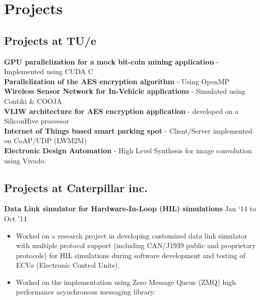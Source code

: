 \documentclass[a4paper,10pt]{article} %
\begin{document}

\section{Projects}
\subsection{Projects at TU/e}
\textbf{GPU parallelization for a mock bit-coin mining application} - Implemented using CUDA C\\
\textbf{Parallelization of the AES encryption algorithm} - Using OpenMP\\
\textbf{Wireless Sensor Network for In-Vehicle applications} - Simulated using Contiki \& COOJA\\
\textbf{VLIW architecture for AES encryption application} - developed on a SiliconHive processor\\
\textbf{Internet of Things based smart parking spot} - Client/Server implemented on CoAP/UDP (LWM2M)\\
\textbf{Electronic Design Automation} - High Level Synthesis for image convolution using Vivado.

\subsection{Projects at Caterpillar inc.}

 \textbf{Data Link simulator for Hardware-In-Loop (HIL) simulations} \hfill Jan ‘14 to Oct '14 
\begin{itemize} \itemsep -2pt %
\item Worked on a research project in developing customized data link simulator with multiple protocol support (including CAN/J1939 public and proprietary protocols) for HIL simulations during software development and testing of ECUs (Electronic Control Units). 
\item Worked on the implementation using Zero Message Queue (ZMQ) high performance asynchronous messaging library.
\end{itemize}
\end{document}

